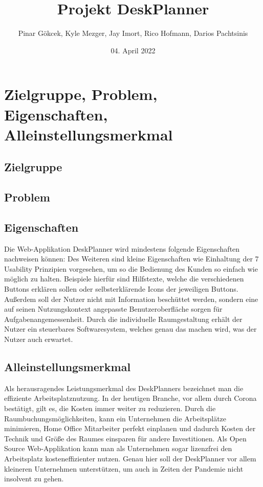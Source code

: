 \documentclass{article}
\title{Projekt DeskPlanner}
\author{Pinar Gökcek, Kyle Mezger, Jay Imort, Rico Hofmann, Darios Pachtsinis}
\date{04. April 2022}
\begin{document}
\begin{titlepage}
    \centering
    \maketitle

    \vfill

\end{titlepage}

\tableofcontents

\pagebreak

\section{Zielgruppe, Problem, Eigenschaften, Alleinstellungsmerkmal}

\subsection{Zielgruppe}

\subsection{Problem}

\subsection{Eigenschaften}
Die Web-Applikation DeskPlanner wird mindestens folgende Eigenschaften nachweisen können:
Des Weiteren sind kleine Eigenschaften wie Einhaltung der 7 Usability Prinzipien
vorgesehen, um so die Bedienung des Kunden so einfach wie möglich zu halten. 
Beispiele hierfür sind Hilfstexte, welche die verschiedenen Buttons erklären sollen
oder selbsterklärende Icons der jeweiligen Buttons. Außerdem soll der Nutzer nicht
mit Information beschüttet werden, sondern eine auf seinen Nutzungskontext
angepasste Benutzeroberfläche sorgen für Aufgabenangemessenheit. Durch die 
individuelle Raumgestaltung erhält der Nutzer ein steuerbares Softwaresystem,
welches genau das machen wird, was der Nutzer auch erwartet.

\subsection{Alleinstellungsmerkmal}
Als herausragendes Leistungsmerkmal des DeskPlanners bezeichnet man die 
effiziente Arbeitsplatznutzung. In der heutigen Branche, vor allem durch Corona 
bestätigt, gilt es, die Kosten immer weiter zu reduzieren. Durch die 
Raumbuchungsmöglichkeiten, kann ein Unternehmen die Arbeitsplätze minimieren, Home Office
Mitarbeiter perfekt einplanen und dadurch Kosten der Technik und Größe des Raumes
einsparen für andere Investitionen. Als Open Source Web-Applikation kann man
als Unternehmen sogar lizenzfrei den Arbeitsplatz kosteneffizienter nutzen.
Genau hier soll der DeskPlanner vor allem kleineren Unternehmen unterstützen, um 
auch in Zeiten der Pandemie nicht insolvent zu gehen.
\end{document}

